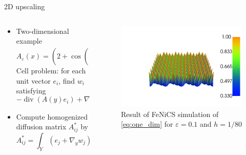 \documentclass{beamer}
\renewcommand{\epsilon}{\varepsilon}
\renewcommand{\div}[1]{\operatorname{div}\left( #1 \right)}
\begin{document}
\begin{frame}[t]{2D upscaling}
\begin{columns}
    \begin{column}[t]{.5\textwidth}
      \begin{itemize}
          \item Two-dimensional example
           \[A_\epsilon(x) =  \left( 2+\cos\left(\frac{2\pi(x+2y)}{\epsilon}\right) \right)^{-1}\]
           Cell problem: for each unit vector $e_i$, find $w_i$ satisfying
           \[-\div{A(y)e_i} + \nabla_y w_i(y)) = 0\]
           \item Compute homogenized diffusion matrix $A^*_{ij}$ by
           \[A^*_{ij} = \int_Y(e_j + \nabla_y w_j)\cdot(e_i + \nabla_y w_i)dy\]
    \end{itemize}
  \end{column}
  \begin{column}[t]{.5\textwidth}
      \begin{figure}[th]
         \centering
         \includegraphics[width=0.85\linewidth]{two_dim_diff.png}
         \caption{Result of FeNiCS simulation of \eqref{eq:one_dim} for $\epsilon=0.1$ and $h = 1/80$}
         \label{fig:one_dim_approx}
     \end{figure}
 \end{column}
\end{columns}
\end{frame}
\end{document}

